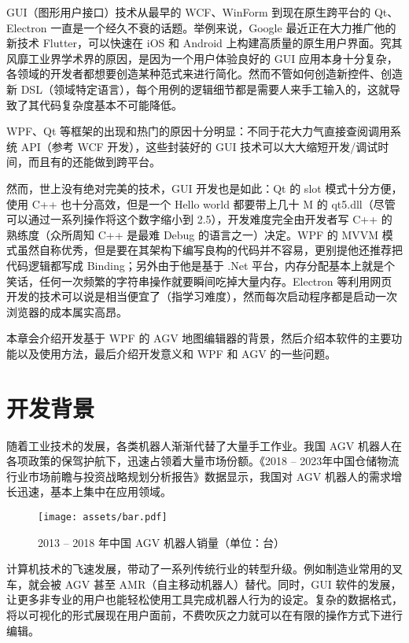 
GUI（图形用户接口）技术从最早的 WCF、WinForm 到现在原生跨平台的 Qt、Electron 一直是一个经久不衰的话题。举例来说，Google 最近正在大力推广他的新技术 Flutter，可以快速在 iOS 和 Android 上构建高质量的原生用户界面。究其风靡工业界学术界的原因，是因为一个用户体验良好的 GUI 应用本身十分复杂，各领域的开发者都想要创造某种范式\cite{url:uiArchs}来进行简化。然而不管如何创造新控件、创造新 DSL（领域特定语言），每个用例的逻辑细节都是需要人来手工输入的，这就导致了其代码复杂度基本不可能降低。

WPF、Qt 等框架的出现和热门的原因十分明显：不同于花大力气直接查阅调用系统 API（参考 WCF 开发），这些封装好的 GUI 技术可以大大缩短开发/调试时间，而且有的还能做到跨平台。

然而，世上没有绝对完美的技术，GUI 开发也是如此：Qt 的 slot 模式十分方便，使用 C++ 也十分高效，但是一个 Hello world 都要带上几十 M 的 qt5.dll（尽管可以通过一系列操作将这个数字缩小到 2.5），开发难度完全由开发者写 C++ 的熟练度（众所周知 C++ 是最难 Debug 的语言之一）决定。WPF 的 MVVM 模式虽然自称优秀，但是要在其架构下编写良构的代码并不容易，更别提他还推荐把代码逻辑都写成 Binding；另外由于他是基于 .Net 平台，内存分配基本上就是个笑话，任何一次频繁的字符串操作就要瞬间吃掉大量内存。Electron 等利用网页开发的技术可以说是相当便宜了（指学习难度），然而每次启动程序都是启动一次浏览器的成本属实高昂。

本章会介绍开发基于 WPF 的 AGV 地图编辑器的背景，然后介绍本软件的主要功能以及使用方法，最后介绍开发意义和 WPF 和 AGV 的一些问题。

\section{开发背景}

随着工业技术的发展，各类机器人渐渐代替了大量手工作业。我国 AGV 机器人在各项政策的保驾护航下，迅速占领着大量市场份额。《2018 -- 2023年中国仓储物流行业市场前瞻与投资战略规划分析报告》数据\cite{url:20180131C02LR0}显示，我国对 AGV 机器人的需求增长迅速，基本上集中在应用领域。

\begin{figure}[H]
  \centering
  \texttt{[image: assets/bar.pdf]}
  \caption{2013 -- 2018 年中国 AGV 机器人销量（单位：台）}
  \label{fig:bar}
\end{figure}

计算机技术的飞速发展，带动了一系列传统行业的转型升级。例如制造业常用的叉车，就会被 AGV 甚至 AMR（自主移动机器人）替代。同时，GUI 软件的发展，让更多非专业的用户也能轻松使用工具完成机器人行为的设定。复杂的数据格式，将以可视化的形式展现在用户面前，不费吹灰之力就可以在有限的操作方式下进行编辑。

